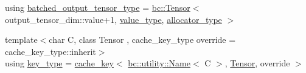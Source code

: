 \begin{DoxyCompactItemize}
\item 
using \hyperlink{structbc_1_1nn_1_1Layer__Manager_af930e926669a5c4130511dcddc289539}{batched\+\_\+output\+\_\+tensor\+\_\+type} = \hyperlink{namespacebc_a659391e47ab612be3ba6c18cf9c89159}{bc\+::\+Tensor}$<$ output\+\_\+tensor\+\_\+dim\+::value+1, \hyperlink{structbc_1_1nn_1_1Layer__Manager_af6edd9edf47c73bfc1b200b3cbf2155f}{value\+\_\+type}, \hyperlink{structbc_1_1nn_1_1Layer__Manager_a6618b1c4afdad0eafd781b319f27f230}{allocator\+\_\+type} $>$
\item 
{\footnotesize template$<$char C, class Tensor , cache\+\_\+key\+\_\+type override = cache\+\_\+key\+\_\+type\+::inherit$>$ }\\using \hyperlink{structbc_1_1nn_1_1Layer__Manager_a7b70f92269eee6d1110acf65cc988b67}{key\+\_\+type} = \hyperlink{structbc_1_1nn_1_1cache__key}{cache\+\_\+key}$<$ \hyperlink{structbc_1_1utility_1_1Name}{bc\+::utility\+::\+Name}$<$ C $>$, \hyperlink{namespacebc_a659391e47ab612be3ba6c18cf9c89159}{Tensor}, override $>$
\end{DoxyCompactItemize}
